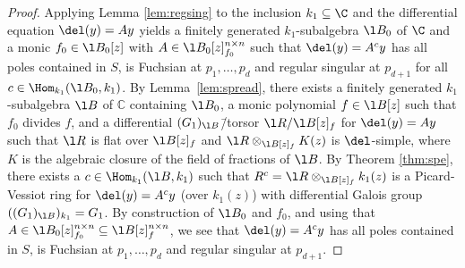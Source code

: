 \documentclass[a4paper, 11pt]{article}
\begin{document}
\begin{proof}
%	 
%	
%	

	Applying Lemma \ref{lem:regsing} to the inclusion $k_1\subseteq \C$ and the differential equation $\del(y)=Ay$ yields a finitely generated $k_1$-subalgebra $\l B_0$ of $\C$ and a monic $f_0\in \l B_0[z]$ with $A\in \l B_0[z]_{f_0}^{n\times n}$ such that $\del(y)=A^cy$ has all poles contained in $S$, is Fuchsian at $p_1,\ldots,p_d$ and regular singular at $p_{d+1}$ for all $c\in\Hom_{k_1}(\l B_0,k_1)$. By Lemma~\ref{lem:spread}, there exists a finitely generated $k_1$-subalgebra $\l B$ of $\mathbb{C}$ containing $\l B_0$, a monic polynomial $f \in \l B[z]$ such that $f_0$ divides $f$, and a differential $(G_1)_{\l B}$\=/torsor $\l R/\l B[z]_f$ for $\del(y)=Ay$ such that $\l R$ is flat over $\l B[z]_f$ and $\l R\otimes_{\l B[z]_f}K(z)$ is $\del$-simple, where $K$ is the algebraic closure of the field of fractions of $\l B$.
	By Theorem \ref{thm:spe}, there exists a $c \in \Hom_{k_1}(\l B, k_1)$ such that $R^c = \l R \otimes_{\l B[z]_f} k_1(z)$ is a Picard-Vessiot ring for $\del(y)=A^cy$ (over $k_1(z)$) with differential Galois group $((G_1)_{\l B})_{k_1}=G_1$.
	By construction of $\l B_0$ and $f_0$, and using that $A\in \l B_0[z]_{f_0}^{n\times n}\subseteq \l B[z]_f^{n\times n}$, we see that $\del(y)=A^cy$ has all poles contained in $S$, is Fuchsian at $p_1,\ldots,p_d$ and regular singular at $p_{d+1}$.
	

\end{proof}
\end{document}
